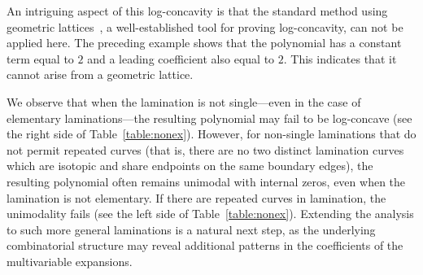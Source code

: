 \documentclass{article}
\theoremstyle{remark}
\begin{document}
An intriguing aspect of this log-concavity is that the standard method using geometric lattices~\cite{AHK18}, a well-established tool for proving log-concavity, can not be applied here. The preceding example shows that the polynomial has a constant term equal to $2$ and a leading coefficient also equal to $2$. This indicates that it cannot arise from a geometric lattice.

We observe that when the lamination is not single—even in the case of elementary laminations—the resulting polynomial may fail to be log-concave (see the right side of Table~\ref{table:nonex}). However, for non-single laminations that do not permit repeated curves (that is, there are no two distinct lamination curves which are isotopic and share endpoints on the same boundary edges), the resulting polynomial often remains unimodal with internal zeros, even when the lamination is not elementary. If there are repeated curves in lamination, the unimodality fails (see the left side of Table~\ref{table:nonex}). Extending the analysis to such more general laminations is a natural next step, as the underlying combinatorial structure may reveal additional patterns in the coefficients of the multivariable expansions.
\end{document}
